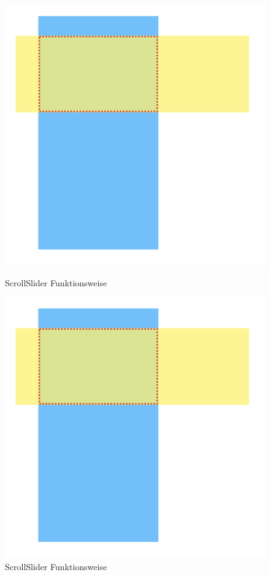 \begin{figure}[H]
    \begin{minipage}[b]{.4\linewidth} 
        \includegraphics[width=\linewidth]{pics/scrollslider.png}
        \caption{ScrollSlider Funktionsweise}
        \label{fig:impl:scrollslider}
    \end{minipage}
    \hspace{.05\linewidth}
    \begin{minipage}[b]{.4\linewidth}
        \includegraphics[width=\linewidth]{pics/scrollslider.png}
        \caption{ScrollSlider Funktionsweise}
        \label{fig:impl:scrollslider}
    \end{minipage}
 \end{figure}

